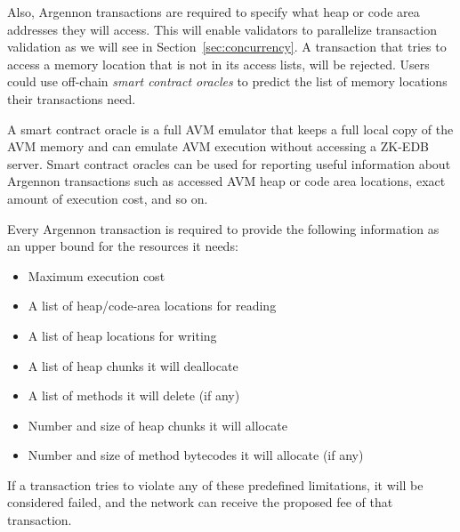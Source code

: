 Also, Argennon transactions are required to specify what heap or code area addresses they will access. This will
enable validators to parallelize transaction validation as we will see in Section~\ref{sec:concurrency}. A transaction
that tries to access a memory location that is not in its access lists, will be rejected.
Users could use off-chain \emph{smart contract oracles} to predict the list of memory locations their transactions need.

A smart contract oracle is a full AVM emulator that keeps a full local copy of the AVM memory and can emulate AVM
execution without accessing a ZK-EDB server. Smart contract oracles can be used for reporting useful information about
Argennon transactions such as accessed AVM heap or code area locations, exact amount of execution cost,
and so on.

Every Argennon transaction is required to provide the following information as an upper bound for the
resources it needs:

\begin{itemize}
    \item Maximum execution cost
    \item A list of heap/code-area locations for reading
    \item A list of heap locations for writing
    \item A list of heap chunks it will deallocate
    \item A list of methods it will delete (if any)
    \item Number and size of heap chunks it will allocate
    \item Number and size of method bytecodes it will allocate (if any)
\end{itemize}

If a transaction tries to violate any of these predefined limitations, it will be considered failed, and the network
can receive the proposed fee of that transaction.


